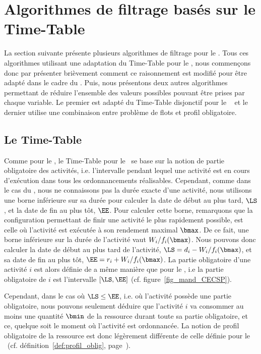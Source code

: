 
\section{Algorithmes de filtrage basés sur le Time-Table}

La section suivante présente plusieurs algorithmes de filtrage pour le
\CECSP. Tous ces algorithmes utilisant une adaptation du Time-Table
pour le \CUSP, nous commençons donc par présenter brièvement comment
ce raisonnement est modifié pour être adapté dans le cadre du \CECSP.
Puis, nous présentons deux autres algorithmes permettant
de réduire l'ensemble des valeurs possibles pouvant être prises par
chaque variable. Le premier est adapté du Time-Table disjonctif pour
le \CUSP~\cite{Gay2015} et le dernier utilise une combinaison entre
problème de flots et profil obligatoire.

\subsection{Le Time-Table}
Comme pour le \CUSP, le Time-Table pour le \CECSP~se base sur la
notion de partie obligatoire des activités, i.e. l'intervalle pendant
lequel une activité est en cours d'exécution dans tous les
ordonnancements réalisables. Cependant, comme dans le cas du \CECSP,
nous ne connaissons pas la durée exacte d'une activité, nous utilisons
une borne inférieure sur sa durée pour calculer la date de début au
plus tard, $\LS$, et la date de fin au plus tôt, $\EE$. Pour calculer
cette borne, remarquons que la configuration permettant de finir une
activité le plus rapidement possible, est celle où l'activité est
exécutée à son rendement maximal $\bmax$. De ce fait, une borne
inférieure sur la durée de l'activité vaut $W_i/f_i(\bmax)$. Nous
pouvons donc calculer la date de début au plus tard de l'activité,
$\LS=d_i-W_i/f_i(\bmax)$, et sa date de fin au plus tôt,
$\EE=r_i+W_i/f_i(\bmax)$. La partie obligatoire d'une activité $i$ est
alors définie de a même manière que pour le \CUSP, i.e la partie
obligatoire de $i$ est l'intervalle $[\LS,\EE]$
(cf. figure~\ref{fig_mand_CECSP}).

Cependant, dans le cas où $\LS \le \EE$, i.e. où l'activité possède
une partie obligatoire, nous pouvons seulement déduire que l'activité
$i$ va consommer au moins une quantité $\bmin$ de la ressource durant
toute sa partie obligatoire, et ce, quelque soit le moment où
l'activité est ordonnancée. La notion de profil obligatoire de la
ressource est donc légèrement différente de celle définie pour le
\CUSP~(cf. définition~\ref{def:profil_oblig},
page~\pageref{def:profil_oblig}).


